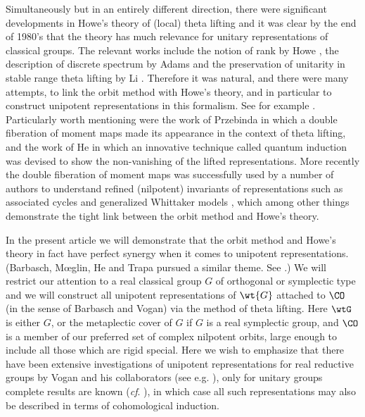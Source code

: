 \documentclass[ssunip.tex]{subfiles}
\begin{document}
Simultaneously but in an entirely different direction, there were significant
developments in Howe's theory of (local) theta lifting and it was clear by the
end of 1980's that the theory has much relevance for unitary representations of
classical groups. The relevant works include the notion of rank by Howe
\cite{HoweRank}, the description of discrete spectrum by Adams \cite{Ad83} and
the preservation of unitarity in stable range theta lifting by Li \cite{Li89}.
Therefore it was natural, and there were many attempts, to link the orbit method
with Howe's theory, and in particular to construct unipotent representations in
this formalism. See for example \cite{Sa,Pz,HZ,HL,Br,He,Tr,PT,B17}. Particularly
worth mentioning were the work of Przebinda \cite{Pz} in which a double
fiberation of moment maps made its appearance in the context of theta lifting,
and the work of He \cite{He} in which an innovative technique called quantum
induction was devised to show the non-vanishing of the lifted representations.
More recently the double fiberation of moment maps was successfully used by a
number of authors to understand refined (nilpotent) invariants of
representations such as associated cycles and generalized Whittaker models
\cite{NOTYK, NZ, GZ, LM}, which among other things demonstrate the tight link
between the orbit method and Howe's theory.


In the present article we will demonstrate that the orbit method and Howe's
theory in fact have perfect synergy when it comes to unipotent representations.
(Barbasch, M{\oe}glin, He and Trapa pursued a similar theme. See
\cite{B17,Mo17,He,Tr}.) We will restrict our attention to a real classical group
$G$ of orthogonal or symplectic type and we will construct all unipotent
representations of $\wt{G}$ attached to $\CO$ (in the sense of Barbasch and
Vogan) via the method of theta lifting. Here $\wtG$ is either $G$, or the
metaplectic cover of $G$ if $G$ is a real symplectic group, and $\CO$ is a
member of our preferred set of complex nilpotent orbits, large enough to include
all those which are rigid special. Here we wish to emphasize that there have
been extensive investigations of unipotent representations for real reductive
groups by Vogan and his collaborators (see e.g. \cite{VoBook,Vo89,ABV}),
only for unitary groups complete results are known (\emph{cf}. \cite{BV83, Tr}), in which case all such representations may also be described in terms of cohomological induction.
\end{document}
